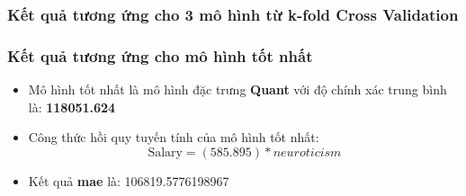 \documentclass{report}
\begin{document}
    \subsubsection{Kết quả tương ứng cho 3 mô hình từ k-fold Cross Validation}
    \begin{table}[H]
        \centering
    \end{table}

    \subsubsection{Kết quả tương ứng cho mô hình tốt nhất}
    \begin{itemize}
        \item Mô hình tốt nhất là mô hình đặc trưng \textbf{Quant} với độ chính xác trung bình là: \textbf{118051.624}
        \item Công thức hồi quy tuyến tính của mô hình tốt nhất: 
        \begin{equation}
            \text{Salary} = (585.895)*neuroticism
        \end{equation}
        \item Kết quả \textbf{mae} là: 106819.5776198967
    \end{itemize}
\end{document}
